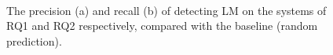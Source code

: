 \begin{figure}
    \centering
    \hfill
    \\

  \caption{The precision (a) and recall (b) of \toolS detecting LM on the systems of RQ1 and RQ2 respectively, compared with the baseline (random prediction).}
  \label{figure:compare}
  \vspace{-0.4cm}
\end{figure}

